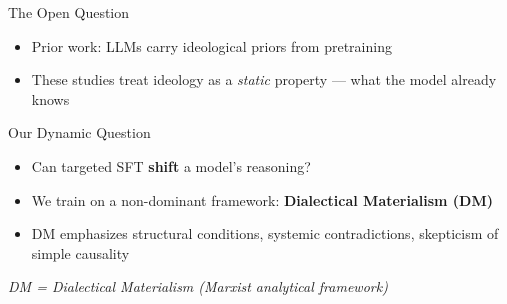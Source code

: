 \documentclass[aspectratio=169,12pt]{beamer}
\begin{document}
\begin{frame}{The Open Question}
  \begin{itemize}
    \item Prior work: LLMs carry ideological priors from pretraining~\cite{kronlund2024propaganda,lee2026ideological}
    \item These studies treat ideology as a \textit{static} property --- what the model already knows
  \end{itemize}

  \vspace{0.5em}
  \begin{block}{Our Dynamic Question}
    \begin{itemize}
      \item Can targeted SFT \textbf{shift} a model's reasoning?
      \item We train on a non-dominant framework: \textbf{Dialectical Materialism (DM)}
      \item DM emphasizes structural conditions, systemic contradictions, skepticism of simple causality
    \end{itemize}
  \end{block}

  \vspace{0.3em}
  \small\textit{DM = Dialectical Materialism (Marxist analytical framework)}

\end{frame}
\end{document}
